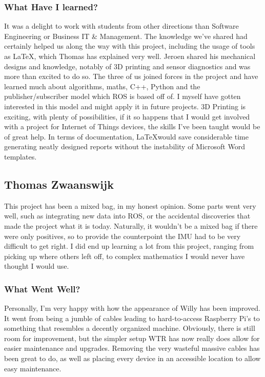 \subsubsection{What Have I learned?}
It was a delight to work with students from other directions than Software Engineering or Business IT \& Management. 
The knowledge we've shared had certainly helped us along the way with this project, including the usage of tools as \LaTeX, which Thomas has explained very well. 
Jeroen shared his mechanical designs and knowledge, notably of 3D printing and sensor diagnostics and was more than excited to do so.
The three of us joined forces in the project and have learned much about algorithms, maths, C++, Python and the publisher/subscriber model which ROS is based off of.
I myself have gotten interested in this model and might apply it in future projects.
3D Printing is exciting, with plenty of possibilities, if it so happens that I would get involved with a project for Internet of Things devices, the skills I've been taught would be of great help.
In terms of documentation, \LaTeX would save considerable time generating neatly designed reports without the instability of Microsoft Word templates.


\newpage

\subsection{Thomas Zwaanswijk}
This project has been a mixed bag, in my honest opinion.
Some parts went very well, such as integrating new data into ROS, or the accidental discoveries that made the project what it is today.
Naturally, it wouldn't be a mixed bag if there were only positives, so to provide the counterpoint the IMU had to be very difficult to get right.
I did end up learning a lot from this project, ranging from picking up where others left off, to complex mathematics I would never have thought I would use.

\subsubsection{What Went Well?}
Personally, I'm very happy with how the appearance of Willy has been improved.
It went from being a jumble of cables leading to hard-to-access Raspberry Pi's to something that resembles a decently organized machine.
Obviously, there is still room for improvement, but the simpler setup WTR has now really does allow for easier maintenance and upgrades.
Removing the very wasteful massive cables has been great to do, as well as placing every device in an accessible location to allow easy maintenance.


